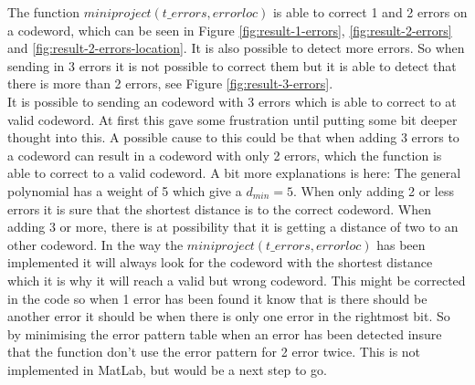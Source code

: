 \documentclass[Main]{subfiles}
\begin{document}
The function $miniproject(t\_errors, errorloc)$ is able to correct 1 and 2 errors on a codeword, which can be seen in Figure \ref{fig:result-1-errors}, \ref{fig:result-2-errors} and \ref{fig:result-2-errors-location}.
It is also possible to detect more errors.
So when sending in 3 errors it is not possible to correct them but it is able to detect that there is more than 2 errors, see Figure \ref{fig:result-3-errors}.\\
It is possible to sending an codeword with 3 errors which is able to correct to at valid codeword.
At first this gave some frustration until putting some bit deeper thought into this.
A possible cause to this could be that when adding 3 errors to a codeword can result in a codeword with only 2 errors, which the function is able to correct to a valid codeword.
A bit more explanations is here:
The general polynomial has a weight of 5 which give a $d_{min}=5$.
When only adding 2 or less errors it is sure that the shortest distance is to the correct codeword.
When adding 3 or more, there is at possibility that it is getting a distance of two to an other codeword.
In the way the $miniproject(t\_errors, errorloc)$ has been implemented it will always look for the codeword with the shortest distance which it is why it will reach a valid but wrong codeword.
This might be corrected in the code so when 1 error has been found it know that is there should be another error it should be when there is only one error in the rightmost bit.
So by minimising the error pattern table when an error has been detected insure that the function don't use the error pattern for 2 error twice.
This is not implemented in MatLab, but would be a next step to go. 
\end{document}
